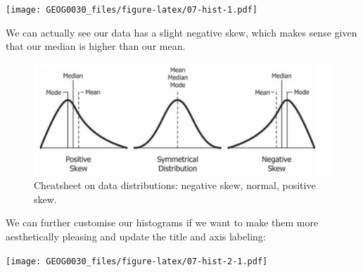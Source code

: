 \documentclass[
]{book}
\newenvironment{Shaded}{\begin{snugshade}}{\end{snugshade}}
\newcommand{\AttributeTok}[1]{\textcolor[rgb]{0.77,0.63,0.00}{#1}}
\newcommand{\CommentTok}[1]{\textcolor[rgb]{0.56,0.35,0.01}{\textit{#1}}}
\newcommand{\DecValTok}[1]{\textcolor[rgb]{0.00,0.00,0.81}{#1}}
\newcommand{\FunctionTok}[1]{\textcolor[rgb]{0.00,0.00,0.00}{#1}}
\newcommand{\NormalTok}[1]{#1}
\newcommand{\SpecialCharTok}[1]{\textcolor[rgb]{0.00,0.00,0.00}{#1}}
\newcommand{\StringTok}[1]{\textcolor[rgb]{0.31,0.60,0.02}{#1}}
\begin{document}
\begin{Shaded}
\end{Shaded}

\texttt{[image: GEOG0030\_files/figure-latex/07-hist-1.pdf]}

We can actually see our data has a slight negative skew, which makes sense given that our median is higher than our mean.

\begin{figure}

{\centering \includegraphics[width=18in]{images/w07/distributions} 

}

\caption{Cheatsheet on data distributions: negative skew, normal, positive skew.}\label{fig:07-data-distro}
\end{figure}

We can further customise our histograms if we want to make them more aesthetically pleasing and update the title and axis labeling:

\begin{Shaded}
\end{Shaded}

\texttt{[image: GEOG0030\_files/figure-latex/07-hist-2-1.pdf]}
\end{document}
